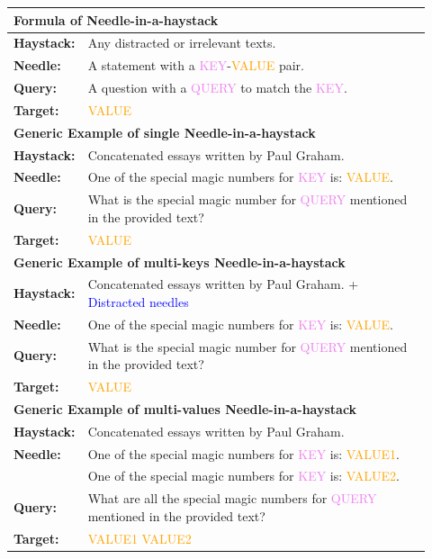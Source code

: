\begin{table}[!h]
\centering
\small
\begin{tabular}{p{0.1\linewidth}p{0.82\linewidth}}
\toprule
    \multicolumn{2}{l}{\textbf{Formula of Needle-in-a-haystack}} \\ \midrule
    \textbf{Haystack:} & Any distracted or irrelevant texts.\\
    \textbf{Needle:} & A statement with a \textcolor{violet}{KEY}-\textcolor{orange}{VALUE} pair. \\
    \textbf{Query:} & A question with a \textcolor{violet}{QUERY} to match the \textcolor{violet}{KEY}.\\
    \textbf{Target:} & \textcolor{orange}{VALUE} \\
    
\midrule
    \multicolumn{2}{l}{\textbf{Generic Example of single Needle-in-a-haystack}} \\ \midrule
    \textbf{Haystack:} & Concatenated essays written by Paul Graham.\\
    \textbf{Needle:} & One of the special magic numbers for \textcolor{violet}{KEY} is: \textcolor{orange}{VALUE}. \\
    \textbf{Query:} & What is the special magic number for \textcolor{violet}{QUERY} mentioned in the provided text?\\
    \textbf{Target:} & \textcolor{orange}{VALUE} \\
    
\midrule
    \multicolumn{2}{l}{\textbf{Generic Example of multi-keys Needle-in-a-haystack}} \\ \midrule
    \textbf{Haystack:} & Concatenated essays written by Paul Graham. + \textcolor{blue}{Distracted needles}\\
    \textbf{Needle:} & One of the special magic numbers for \textcolor{violet}{KEY} is: \textcolor{orange}{VALUE}. \\
    \textbf{Query:} & What is the special magic number for \textcolor{violet}{QUERY} mentioned in the provided text?\\
    \textbf{Target:} & \textcolor{orange}{VALUE} \\
    
\midrule
    \multicolumn{2}{l}{\textbf{Generic Example of multi-values Needle-in-a-haystack}} \\ \midrule
    \textbf{Haystack:} & Concatenated essays written by Paul Graham.\\
    \textbf{Needle:} & One of the special magic numbers for \textcolor{violet}{KEY} is: \textcolor{orange}{VALUE1}. \\
     & One of the special magic numbers for \textcolor{violet}{KEY} is: \textcolor{orange}{VALUE2}. \\
    \textbf{Query:} & What are all the special magic numbers for \textcolor{violet}{QUERY} mentioned in the provided text?\\
    \textbf{Target:} & \textcolor{orange}{VALUE1 VALUE2} \\
    

\end{tabular}
\end{table}
